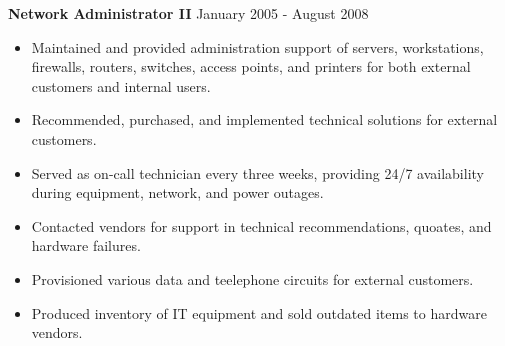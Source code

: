 \documentclass[11pt]{article}       %
\begin{document}
\textbf{Network Administrator II} \hfill January 2005 - August 2008 \\
\vspace{-9pt}
\begin{itemize}
  \item Maintained and provided administration support of servers, workstations, firewalls, routers, switches, access points, and printers for both external customers and internal users.
  \item Recommended, purchased, and implemented technical solutions for external customers.
  \item Served as on-call technician every three weeks, providing 24/7 availability during equipment, network, and power outages.
  \item Contacted vendors for support in technical recommendations, quoates, and hardware failures.
  \item Provisioned various data and teelephone circuits for external customers.
  \item Produced inventory of IT equipment and sold outdated items to hardware vendors.
\end{itemize}

\vspace{-18.5pt}

\end{document}
